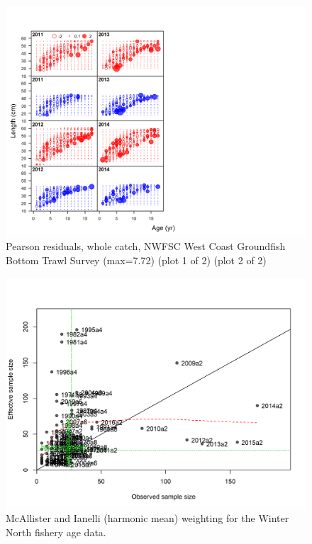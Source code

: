 \documentclass[12pt,]{article}
\begin{document}
\begin{figure}
\centering
\includegraphics{r4ss/plots_mod1/comp_condAALfit_residsflt7mkt0_page2.png}
\caption{Pearson residuals, whole catch, NWFSC West Coast Groundfish
Bottom Trawl Survey (max=7.72) (plot 1 of 2) (plot 2 of 2)
\label{fig:nwfsc_combo_pearson_2}}
\end{figure}

\begin{figure}
\centering
\includegraphics{r4ss/plots_mod1/comp_agefit_sampsize_flt1mkt2.png}
\caption{McAllister and Ianelli (harmonic mean) weighting for the Winter
North fishery age data. \label{fig:harm_mean_wn_age}}
\end{figure}
\end{document}

